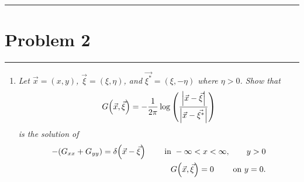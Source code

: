 \documentclass{article} %
\theoremstyle{plain}
\newcommand{\problem}[1]{
\vspace{.375cm}
\begin{minipage}{\textwidth}
    \begin{center}
        \noindent\rule{5cm}{1pt}
    \end{center}
    \section{\bf #1}
    \begin{center}
        \noindent\rule{5cm}{1pt}
    \end{center}
    \vspace{0.25cm}
\end{minipage}
}
\begin{document}
\problem{Problem 2}
\begin{enumerate}[\it (a)]
    \item
        \emph{Let $\vec{x} = (x,y)$, $\vec{\xi} = (\xi, \eta)$, and $\vec{\xi^*} = (\xi, -\eta)$ where $\eta > 0$.  Show that $$G\qty(\vec{x}, \vec{\xi}) = - \frac{1}{2\pi}\log\qty(\frac{\left|\vec{x} - \vec{\xi}\right|}{\left|\vec{x} - \vec{\xi^*}\right|})$$ is the solution of}
        \begin{align*}
            -\qty(G_{xx} + G_{yy}) = \delta\qty(\vec{x} - \vec{\xi}) \qquad \text{ in } - \infty < x < \infty, \qquad y > 0 \\
            G\qty(\vec{x}, \vec{\xi}) = 0 \qquad \text{ on } y = 0.
        \end{align*}


\end{enumerate}
\end{document}
